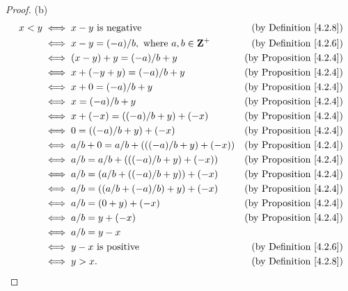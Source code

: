 \begin{proof}{(b)}
\begin{align*}
x < y & \iff x - y \text{ is negative} & \text{(by Definition \ref{4.2.8})} \\
& \iff x - y = (-a) / b, \text{ where } a, b \in \mathbf{Z}^+ & \text{(by Definition \ref{4.2.6})} \\
& \iff (x - y) + y = (-a) / b + y & \text{(by Proposition \ref{4.2.4})} \\
& \iff x + (-y + y) = (-a) / b + y & \text{(by Proposition \ref{4.2.4})} \\
& \iff x + 0 = (-a) / b + y & \text{(by Proposition \ref{4.2.4})} \\
& \iff x = (-a) / b + y & \text{(by Proposition \ref{4.2.4})} \\
& \iff x + (-x) = ((-a) / b + y) + (-x) & \text{(by Proposition \ref{4.2.4})} \\
& \iff 0 = ((-a) / b + y) + (-x) & \text{(by Proposition \ref{4.2.4})} \\
& \iff a / b + 0 = a / b + (((-a) / b + y) + (-x)) & \text{(by Proposition \ref{4.2.4})} \\
& \iff a / b = a / b + (((-a) / b + y) + (-x)) & \text{(by Proposition \ref{4.2.4})} \\
& \iff a / b = (a / b + ((-a) / b + y)) + (-x) & \text{(by Proposition \ref{4.2.4})} \\
& \iff a / b = ((a / b + (-a) / b) + y) + (-x) & \text{(by Proposition \ref{4.2.4})} \\
& \iff a / b = (0 + y) + (-x) & \text{(by Proposition \ref{4.2.4})} \\
& \iff a / b = y + (-x) & \text{(by Proposition \ref{4.2.4})} \\
& \iff a / b = y - x \\
& \iff y - x \text{ is positive} & \text{(by Definition \ref{4.2.6})} \\
& \iff y > x. & \text{(by Definition \ref{4.2.8})}
\end{align*}
\end{proof}

